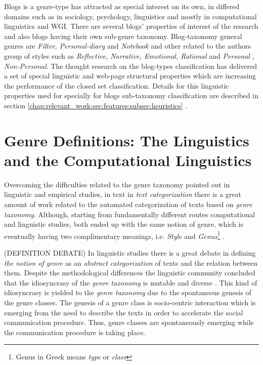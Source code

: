 Blogs is a genre-type has attracted as special interest on its own, in differed domains such as in sociology, psychology, linguistics and mostly in computational linguistics and WGI. There are several blogs' properties of interest of the research and  also blogs having their own sub-genre taxonomy. Blog-taxonomy general genres are \textit{Filter, Personal-diary} and \textit{Notebook} and other related to the authors group of styles such as \textit{Reflective, Narrative, Emotional, Rational} and \textit{Personal , Non-Personal}. The thought research on the blog-types classification has delivered a set of special linguistic and web-page structural properties which are increasing the performance of the closed set classification. Details for this linguistic properties used for specially for blogs sub-taxonomy classification are described in section \ref{chap:relevant_work:sec:features:subsec:heuristics} \cite{virik2017blog,hoffmann2012cohesive,hoffmann2012cohesive,derczynski2014social,qu2006automated}. 

\section{Genre Definitions: The Linguistics and the Computational Linguistics}\label{chap:relevant_work:sec:linguistics_definition}

Overcoming the difficulties related to the genre taxonomy pointed out in linguistic and empirical studies, in text in \textit{text categorization} there is a great amount of work related to the automated categorization of texts based on \textit{genre taxonomy}. Although, starting from fundamentally different routes computational and linguistic studies, both ended up with the same notion of genre, which is eventually having two complimentary meanings,  i.e. \textit{Style} and \textit{Genus}\footnote{Genus in Greek means \textit{type} or \textit{class}} \parencite{sugiyanto2014term}. 

(DEFINITION DEBATE) In linguistic studies there is a great debate in defining \textit{the notion of genre} as an \textit{abstract categorization} of texts and the relation between them. Despite the methodological differences the linguistic community concluded that the idiosyncrasy of the \textit{genre taxonomy} is mutable and diverse \parencite{coutinho2009describe}. This kind of idiosyncrasy is yielded to the \textit{genre taxonomy} due to the spontaneous genesis of the genre classes. The genesis of a genre class is socio-centric interaction which is emerging from the need to describe the texts in order to accelerate the social communication procedure. Thus, genre classes are spontaneously emerging while the communication procedure is taking place.

